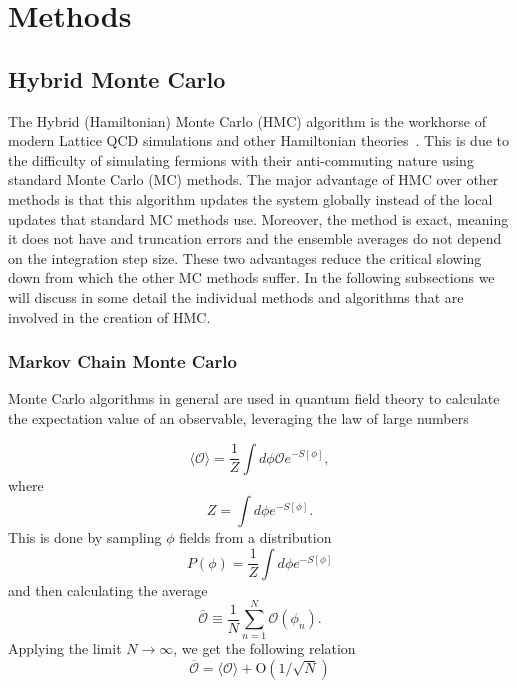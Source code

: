 
\chapter{Methods}
\label{sec:methods}
\section{Hybrid Monte Carlo}
\label{sec:hmc}
The Hybrid (Hamiltonian) Monte Carlo (HMC) algorithm is the workhorse of modern Lattice QCD simulations and other Hamiltonian theories~\cite{hmccm}. This is due to the difficulty of simulating fermions with their anti-commuting nature using standard Monte Carlo (MC) methods. The major advantage of HMC over other methods is that this algorithm updates the system globally instead of the local updates that standard MC methods use. Moreover, the method is exact, meaning it does not have and truncation errors and the ensemble averages do not depend on the integration step size. These two advantages reduce the critical slowing down from which the other MC methods suffer. In the following subsections we will discuss in some detail the individual methods and algorithms that are involved in the creation of HMC.

\subsection{Markov Chain Monte Carlo}

Monte Carlo algorithms in general are used in quantum field theory to calculate the expectation value of an observable, leveraging the law of large numbers

\begin{equation}
    \langle\mathcal{O}\rangle = \frac{1}{Z} \int d\phi \mathcal{O} e^{-S[\phi]},
\end{equation}
where
\begin{equation}
    Z = \int d\phi e^{-S[\phi]}.
\end{equation}
This is done by sampling $\phi$ fields from a distribution
\begin{equation}
    P(\phi) = \frac{1}{Z} \int d\phi e^{-S[\phi]}
\end{equation}
and then calculating the average
\begin{equation}
    \overline{\mathcal{O}} \equiv \frac{1}{N}\sum^{N}_{n=1} \mathcal{O}(\phi_n).
    \label{eq:ensamble_average}
\end{equation}
Applying the limit $N \to \infty$, we get the following relation
\begin{equation}
    \overline{\mathcal{O}} = \langle\mathcal{O}\rangle + \mathrm{O}(1/\sqrt{N})
\end{equation}

